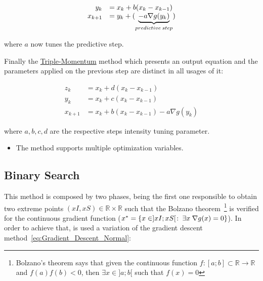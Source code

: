 \begin{equation}
    \begin{array}{rl}
      y_k &=  x_k + b (x_k - x_{k-1})  \\
      x_{k+1} &= y_k + (\underbrace{- a \nabla g(y_k)}_{predictive  \hspace{0.2em}step})
    \end{array}
    \label{eq:Gradient_Descent_Nesterov}
\end{equation}

where \(a\) now tunes the predictive step. \par

Finally the \underline{Triple-Momentum} method which presents an output equation and the parameters applied on the previous step are distinct in all usages of it:

\begin{equation}
    \begin{array}{rl}
      z_k &= x_k + d (x_k - x_{k-1}) \\
      y_k &=  x_k + c (x_k - x_{k-1})  \\
      x_{k+1} &= x_k + b(x_k - x_{k-1}) - a \nabla g(y_k)
    \end{array}
    \label{eq:Gradient_Triple_Momentum}
\end{equation}

where \(a, b, c, d\) are the respective steps intensity tuning parameter. \\




\begin{tcolorbox}[colback=blue!5!white,colframe=blue!35!white,title=Notes:]
\begin{itemize}
    \item The method supports multiple optimization variables.
\end{itemize}
\end{tcolorbox} 







\newpage %


\subsection{Binary Search}
\label{subsec:Binary_Search}

This method is composed by two phases, being  the first one responsible to obtain two extreme points \((xI,xS) \in \mathbb{R} \times \mathbb{R}\) such that the Bolzano theorem~\footnote{Bolzano's theorem says that given the continuous function \(f:[a;b] \subset \mathbb{R} \to \mathbb{R}\) and \(f(a)f(b) < 0\), then \(\exists x \in  ]a; b[\) such that \(f(x) = 0\)} is verified for the continuous gradient function (\(  x^*= \{ x \in ]xI; xS[ \hspace{0.1em}  : \hspace{0.25em} \exists x \hspace{0.25em}\nabla g(x) = 0 \} \)). In order to achieve that, is used a variation of the gradient descent method~\eqref{eq:Gradient_Descent_Normal}:

